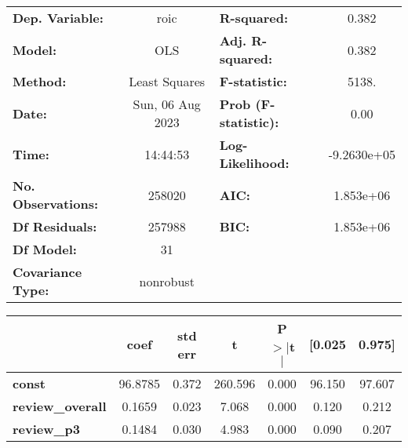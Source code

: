 \begin{center}
\begin{tabular}{lclc}
\toprule
\textbf{Dep. Variable:}                                               &       roic       & \textbf{  R-squared:         } &      0.382   \\
\textbf{Model:}                                                       &       OLS        & \textbf{  Adj. R-squared:    } &      0.382   \\
\textbf{Method:}                                                      &  Least Squares   & \textbf{  F-statistic:       } &      5138.   \\
\textbf{Date:}                                                        & Sun, 06 Aug 2023 & \textbf{  Prob (F-statistic):} &      0.00    \\
\textbf{Time:}                                                        &     14:44:53     & \textbf{  Log-Likelihood:    } & -9.2630e+05  \\
\textbf{No. Observations:}                                            &      258020      & \textbf{  AIC:               } &  1.853e+06   \\
\textbf{Df Residuals:}                                                &      257988      & \textbf{  BIC:               } &  1.853e+06   \\
\textbf{Df Model:}                                                    &          31      & \textbf{                     } &              \\
\textbf{Covariance Type:}                                             &    nonrobust     & \textbf{                     } &              \\
\bottomrule
\end{tabular}
\begin{tabular}{lcccccc}
                                                                      & \textbf{coef} & \textbf{std err} & \textbf{t} & \textbf{P$> |$t$|$} & \textbf{[0.025} & \textbf{0.975]}  \\
\midrule
\textbf{const}                                                        &      96.8785  &        0.372     &   260.596  &         0.000        &       96.150    &       97.607     \\
\textbf{review\_overall}                                              &       0.1659  &        0.023     &     7.068  &         0.000        &        0.120    &        0.212     \\
\textbf{review\_p3}                                                   &       0.1484  &        0.030     &     4.983  &         0.000        &        0.090    &        0.207     \\

\end{tabular}
\end{center}
